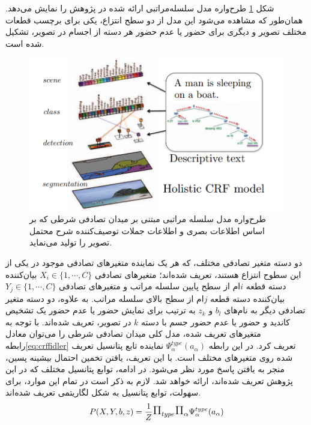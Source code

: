 شکل
\ref{fig:F2013SF1}
طرح‌واره مدل سلسله‌مراتبی ارائه شده در پژوهش \cite{fidler2013sentence} را نمایش می‌دهد. همان‌طور که مشاهده می‌شود این مدل از دو سطح انتزاع، یکی برای برچسب قطعات مختلف تصویر و دیگری برای حضور یا عدم حضور هر دسته از اجسام در تصویر، تشکیل شده است.

\begin{figure}[h]
	\center
	\includegraphics[scale=0.4]{./Imgs/fidler2013sentence_f1.png}
	\caption[مدل سلسله‌مراتبی میدان تصادفی شرطی در درک صحنه]{طرح‌واره مدل سلسله مراتبی مبتنی بر میدان تصادفی شرطی که بر اساس اطلاعات بصری و اطلاعات جملات توصیف‌کننده شرح محتمل تصویر را تولید می‌نماید\cite{fidler2013sentence}.}
	\label{fig:F2013SF1}
\end{figure}

دو دسته متغیر تصادفی مختلف، که هر یک نماینده متغیرهای تصادفی موجود در یکی از این سطوح انتزاع هستند، تعریف شده‌اند؛ 
متغیرهای تصادفی
 $X_i \in \{1, \cdots,C\}$ 
بیان‌کننده دسته قطعه $i$ام از سطح پایین سلسله مراتب و متغیرهای تصادفی
 $Y_j \in \{1, \cdots,C\}$ 
 بیان‌کننده دسته قطعه $j$ام از سطح بالای سلسله مراتب.
به علاوه، دو دسته متغیر تصادفی دیگر به نام‌های $b_l$ و $z_k$ به ترتیب برای نمایش حضور یا عدم حضور یک تشخیص کاندید و حضور یا عدم حضور جسم با دسته $k$ در تصویر، تعریف شده‌اند. با توجه به متغیرهای تعریف شده، مدل کلی میدان تصادفی شرطی را می‌توان معادل رابطه\eqref{eq:crffidler} تعریف کرد. در این رابطه $\Psi_\alpha^{type}(a_\alpha)$ نماینده تابع پتانسیل تعریف شده روی متغیرهای مختلف است. با این تعریف، یافتن تخمین احتمال بیشینه پسین، منجر به یافتن پاسخ مورد نظر می‌شود.
در ادامه، توابع پتانسیل مختلف که در این پژوهش تعریف شده‌اند، ارائه خواهد شد. لازم به ذکر است در تمام این موارد، برای سهولت، توابع پتانسیل به شکل لگاریتمی تعریف شده‌اند.
\begin{equation}
P(X,Y,b,z) = \frac{1}{Z} \mathlarger{\mathlarger{\Pi}}_{type} \mathlarger{\mathlarger{\Pi}}_\alpha \Psi_\alpha^{type}(a_\alpha)
\label{eq:crffidler}
\end{equation}

